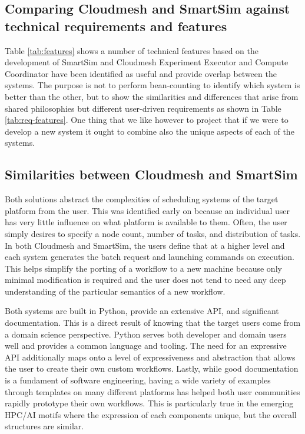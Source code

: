 \documentclass[sigconf]{acmart}
\begin{document}
\subsection{Comparing Cloudmesh and SmartSim against technical requirements and features}
\label{sec:compare}

Table \ref{tab:features} shows a number of technical features based on the development of SmartSim and Cloudmesh Experiment Executor and Compute Coordinator have been identified as useful and provide overlap between the systems. The purpose is not to perform bean-counting to identify which system is better than the other, but to show the similarities and differences that arise from shared philosophies but different user-driven requirements  as shown in Table \ref{tab:req-features}. One thing that we like however to project that if we were to develop a new system it ought to combine also the unique aspects of each of the systems.

\subsection{Similarities between Cloudmesh and SmartSim}

Both solutions abstract the complexities of scheduling systems of the target platform from the user. This was identified early on because an individual user has very little influence on what platform is available to them. Often, the user simply desires to specify a node count, number of tasks, and distribution of tasks. In both Cloudmesh and SmartSim, the users define that at a higher level and each system generates the batch request and launching commands on execution. This helps simplify the porting of a workflow to a new machine because only minimal modification is required and the user does not tend to need any deep understanding of the particular semantics of a new workflow.

Both systems are built in Python, provide an extensive API, and significant documentation. This is a direct result of knowing that the target users come from a domain science perspective. Python serves both developer and domain users well and provides a common language and tooling. The need for an expressive API additionally maps onto a level of expressiveness and abstraction that allows the user to create their own custom workflows. Lastly, while good documentation is a fundament of software engineering, having a wide variety of examples through templates on many different platforms has helped both user communities rapidly prototype their own workflows. This is particularly true in the emerging HPC/AI motifs \citep{brewer2024ai} where the expression of each components unique, but the overall structures are similar.
\end{document}
